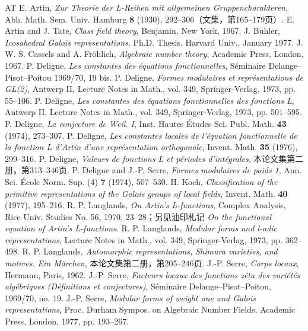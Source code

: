 \begin{thebibliography}{AT}
 E. Artin, \emph{Zur Theorie der L-Reihen mit allgemeinen Gruppencharakteren}, Abh. Math. Sem. Univ. Hamburg \textbf{8} (1930), 292--306（文集，第165--179页）.
 E. Artin and J. Tate, \emph{Class field theory}, Benjamin, New York, 1967.
 J. Buhler, \emph{Icosahedral Galois representations}, Ph.D. Thesis, Harvard Univ., January 1977.
 J. W. S. Cassels and A. Fröhlich, \emph{Algebraic number theory}, Academic Press, London, 1967.
 P. Deligne, \emph{Les constantes des équations fonctionnelles}, Séminaire Delange--Pisot--Poitou 1969/70, 19 bis.
 P. Deligne, \emph{Formes modulaires et représentations de GL(2)}, Antwerp II, Lecture Notes in Math., vol. 349, Springer-Verlag, 1973, pp. 55--106.
 P. Deligne, \emph{Les constantes des équations fonctionnelles des fonctions L}, Antwerp II, Lecture Notes in Math., vol. 349, Springer-Verlag, 1973, pp. 501--595.
 P. Deligne, \emph{La conjecture de Weil. I}, Inst. Hautes Études Sci. Publ. Math. \textbf{43} (1974), 273--307.
 P. Deligne, \emph{Les constantes locales de l'équation fonctionnelle de la fonction L d'Artin d'une représentation orthogonale}, Invent. Math. \textbf{35} (1976), 299--316.
 P. Deligne, \emph{Valeurs de fonctions L et périodes d'intégrales}, 本论文集第二册，第313--346页.
 P. Deligne and J.-P. Serre, \emph{Formes modulaires de poids 1}, Ann. Sci. École Norm. Sup. (4) \textbf{7} (1974), 507--530.
 H. Koch, \emph{Classification of the primitive representations of the Galois groups of local fields}, Invent. Math. \textbf{40} (1977), 195--216.
 R. P. Langlands, \emph{On Artin's L-functions}, Complex Analysis, Rice Univ. Studies No. 56, 1970, 23--28；另见油印札记 \emph{On the functional equation of Artin's L-functions}.
 R. P. Langlands, \emph{Modular forms and l-adic representations}, Lecture Notes in Math., vol. 349, Springer-Verlag, 1973, pp. 362--498.
 R. P. Langlands, \emph{Automorphic representations, Shimura varieties, and motives. Ein Märchen}, 本论文集第二册，第205--246页.
 J.-P. Serre, \emph{Corps locaux}, Hermann, Paris, 1962.
 J.-P. Serre, \emph{Facteurs locaux des fonctions zêta des variétés algébriques (Définitions et conjectures)}, Séminaire Delange--Pisot--Poitou, 1969/70, no. 19.
 J.-P. Serre, \emph{Modular forms of weight one and Galois representations}, Proc. Durham Sympos. on Algebraic Number Fields, Academic Press, London, 1977, pp. 193--267.

\end{thebibliography}
